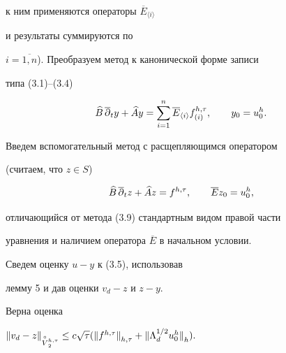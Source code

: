 к ним применяются операторы $\overline E_{\langle i\rangle}$


и результаты суммируются по 


$i=\overline{1,n}$). Преобразуем метод к канонической форме записи


типа (3.1)--(3.4)


\begin{equation}


\bbb\,\overline\partial_ty+\aaa y=\sum_{i=1}^n\overline E_{\langle i\rangle}


f_{(i)}^{h,\tau},\qquad y_0=u_0^h.


\end{equation}





Введем вспомогательный метод с расщепляющимся оператором


(считаем, что $z\in S$)


\begin{equation}


{\bbb\,\overline\partial}_t z+\aaa z=f^{h,\tau},\qquad 


{\overline E}z_0=u_0^h,


\end{equation}


отличающийся от метода (3.9) стандартным видом правой части


уравнения и наличием оператора ${\overline E}$ в начальном условии.





Сведем оценку $u-y$ к (3.5), использовав


лемму 5 и дав оценки $v_d-z$ и $z-y$.





\begin{lem} Верна оценка


${\ver v_d-z \ver}_{\overset{\circ}{V}{}_2^{h,\tau}}\le c\sqrt\tau


({\ver f^{h,\tau}\ver}_{h,\tau}+{\ver\Lambda_d^{1/2}u_0^h\ver}_{h}).$


\end{lem}





